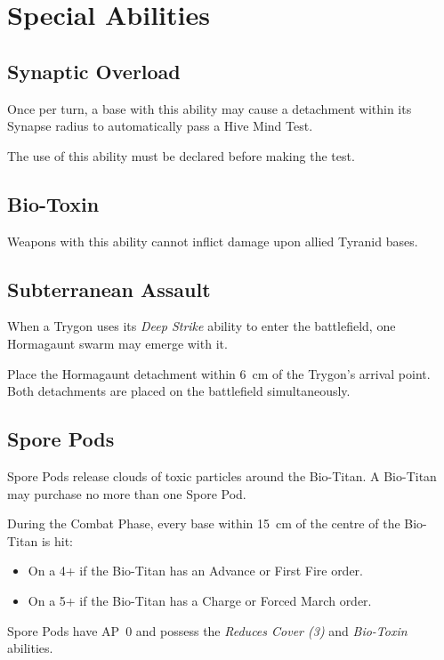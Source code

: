 \section{Special Abilities}

\subsection{Synaptic Overload}

Once per turn, a base with this ability may cause a detachment within its Synapse radius to automatically pass a Hive Mind Test.

The use of this ability must be declared before making the test.

\subsection{Bio-Toxin}

Weapons with this ability cannot inflict damage upon allied Tyranid bases.

\subsection{Subterranean Assault}

When a Trygon uses its \textit{Deep Strike} ability to enter the battlefield, one Hormagaunt swarm may emerge with it.

Place the Hormagaunt detachment within 6~cm of the Trygon's arrival point. Both detachments are placed on the battlefield simultaneously.

\subsection{Spore Pods}

Spore Pods release clouds of toxic particles around the Bio-Titan. A Bio-Titan may purchase no more than one Spore Pod.

During the Combat Phase, every base within 15~cm of the centre of the Bio-Titan is hit:

\begin{itemize}
    \item On a 4+ if the Bio-Titan has an Advance or First Fire order.
    \item On a 5+ if the Bio-Titan has a Charge or Forced March order.
\end{itemize}

Spore Pods have AP~0 and possess the \textit{Reduces Cover (3)} and \textit{Bio-Toxin} abilities.

